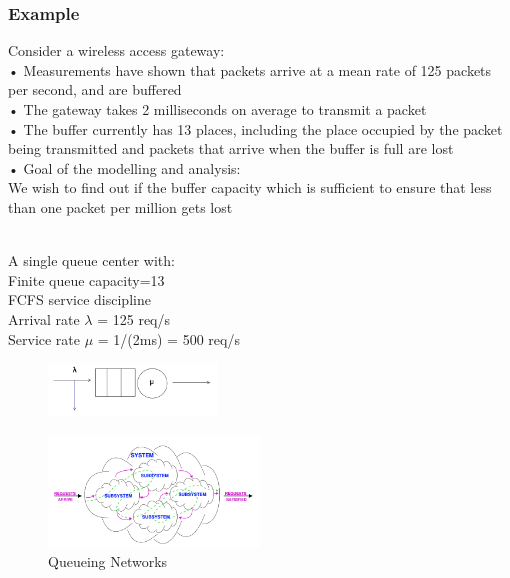 \documentclass[10pt, oneside]{article}
\begin{document}
\begin{itemize}
\subsubsection*{Example}Consider a wireless access gateway:\\
• Measurements have shown that packets arrive at a mean rate of 125
packets per second, and are buffered\\
• The gateway takes 2 milliseconds on average to transmit a packet\\
• The buffer currently has 13 places, including the place occupied by the packet being transmitted and packets that arrive when the buffer is full are lost\\
• Goal of the modelling and analysis:\\
 We wish to find out if the buffer capacity which is sufficient to ensure that less than one packet per million gets lost\\\\
\begin{multicols}{2}
    A single queue center with:\\
 Finite queue capacity=13\\
 FCFS service discipline\\
 Arrival rate $\lambda$ = 125 req/s\\
 Service rate $\mu$ = 1/(2ms) = 500 req/s \columnbreak \begin{figure}[H]
    \begin{center}
    \includegraphics[width=0.4\textwidth]{img/img100.png}
    \end{center}
\end{figure}
\end{multicols}
\begin{figure}[H]
    \begin{center}
    \includegraphics[width=0.5\textwidth]{img/img101.png}
    \caption{Queueing Networks}
    \end{center}

\end{figure}
\end{itemize}
\end{document}
